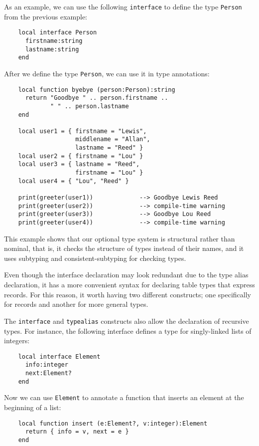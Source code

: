 As an example, we can use the following \texttt{interface} to
define the type \texttt{Person} from the previous example:
\begin{verbatim}
    local interface Person
      firstname:string
      lastname:string
    end
\end{verbatim}

After we define the type \texttt{Person}, we can use it in type annotations:
\begin{verbatim}
    local function byebye (person:Person):string
      return "Goodbye " .. person.firstname ..
             " " .. person.lastname
    end

    local user1 = { firstname = "Lewis",
                    middlename = "Allan",
                    lastname = "Reed" }
    local user2 = { firstname = "Lou" }
    local user3 = { lastname = "Reed",
                    firstname = "Lou" }
    local user4 = { "Lou", "Reed" }

    print(greeter(user1))             --> Goodbye Lewis Reed 
    print(greeter(user2))             --> compile-time warning
    print(greeter(user3))             --> Goodbye Lou Reed
    print(greeter(user4))             --> compile-time warning
\end{verbatim}

This example shows that our optional type system is structural rather
than nominal, that is, it checks the structure of types instead of
their names, and it uses subtyping and consistent-subtyping for
checking types.

Even though the interface declaration may look redundant due to
the type alias declaration, it has a more convenient syntax
for declaring table types that express records.
For this reason, it worth having two different constructs;
one specifically for records and another for more general types.

The \texttt{interface} and \texttt{typealias} constructs also allow
the declaration of recursive types.
For instance, the following interface defines a type for singly-linked
lists of integers:
\begin{verbatim}
    local interface Element
      info:integer
      next:Element?
    end
\end{verbatim}

Now we can use \texttt{Element} to annotate a function that
inserts an element at the beginning of a list:
\begin{verbatim}
    local function insert (e:Element?, v:integer):Element 
      return { info = v, next = e }
    end
\end{verbatim}

